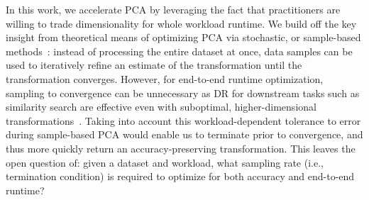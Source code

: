 In this work, we accelerate PCA by leveraging the fact that practitioners are willing to trade dimensionality for whole workload runtime. 
We build off the key insight from theoretical means of optimizing PCA via stochastic, or sample-based methods~\cite{shamir,re-new}:  instead of processing the entire dataset at once, data samples can be used to iteratively refine an estimate of the transformation until the transformation converges. 
However, for end-to-end runtime optimization, sampling to convergence can be unnecessary as DR for downstream tasks such as similarity search are effective even with suboptimal, higher-dimensional transformations~\cite{keogh-study}.
Taking into account this workload-dependent tolerance to error during sample-based PCA would enable us to terminate prior to convergence, and thus more quickly return an accuracy-preserving transformation. 
This leaves the open question of: given a dataset and workload, what sampling rate (i.e., termination condition) is required to optimize for both accuracy and end-to-end runtime?




